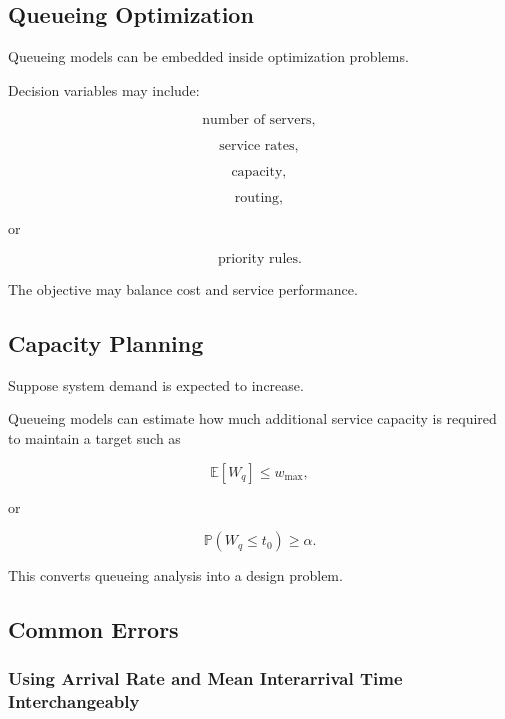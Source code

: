 \subsection{Queueing Optimization}
\label{subsec:queueing-optimization}

Queueing models can be embedded inside optimization problems.

Decision variables may include:

\[
\boxed{
\text{number of servers},
}
\]

\[
\boxed{
\text{service rates},
}
\]

\[
\boxed{
\text{capacity},
}
\]

\[
\boxed{
\text{routing},
}
\]

or

\[
\boxed{
\text{priority rules}.
}
\]

The objective may balance cost and service performance.

\subsection{Capacity Planning}
\label{subsec:queue-capacity-planning}

Suppose system demand is expected to increase.

Queueing models can estimate how much additional service capacity is
required to maintain a target such as

\[
\boxed{
\mathbb{E}[W_q]
\leq
w_{\max},
}
\]

or

\[
\boxed{
\mathbb{P}(W_q\leq t_0)
\geq
\alpha.
}
\]

This converts queueing analysis into a design problem.

\subsection{Common Errors}
\label{subsec:queueing-common-errors}

\subsubsection{Using Arrival Rate and Mean Interarrival Time Interchangeably}

